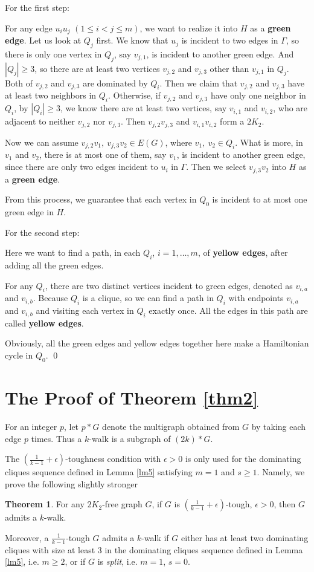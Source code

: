 \documentclass{amsart}
\theoremstyle{definition}
\newtheorem{theorem}{Theorem}
\begin{document}
For the first step:

For any edge $u_iu_j$ $(1\le i<j\le m)$, we want to realize it into $H$ as a {\bf green edge}. Let us look at $Q_j$ first. We know that $u_j$ is incident to two edges in $\Gamma$, so there is only one vertex in $Q_j$, say $v_{j,1}$, is incident to another green edge. And $|Q_j|\ge3$, so there are at least two vertices $v_{j,2}$ and $v_{j,3}$ other than $v_{j,1}$ in $Q_j$. Both of $v_{j,2}$ and $v_{j,3}$ are dominated by $Q_i$. Then we claim that $v_{j,2}$ and $v_{j,3}$ have at least two neighbors in $Q_i$. Otherwise, if $v_{j,2}$ and $v_{j,3}$ have only one neighbor in $Q_i$, by $|Q_i|\ge3$, we know there are at least two vertices, say $v_{i,1}$ and $v_{i,2}$, who are adjacent to neither $v_{j,2}$ nor $v_{j,3}$. Then $v_{j,2}v_{j,3}$ and $v_{i,1}v_{i,2}$ form a $2K_2$.

Now we can assume $v_{j,2}v_1,~v_{j,3}v_2\in E(G)$, where $v_1,~v_2\in Q_i$. What is more, in $v_1$ and $v_2$, there is at most one of them, say $v_1$, is incident to another green edge, since there are only two edges incident to $u_i$ in $\Gamma$. Then we select $v_{j,3}v_2$ into $H$ as a {\bf green edge}.

From this process, we guarantee that each vertex in $Q_0$ is incident to at most one green edge in $H$.

For the second step:

Here we want to find a path, in each $Q_i$, $i=1,\dots,m$, of {\bf yellow edges}, after adding all the green edges.

For any $Q_i$, there are two distinct vertices incident to green edges, denoted as $v_{i,a}$ and $v_{i,b}$. Because $Q_i$ is a clique, so we can find a path in $Q_i$ with endpoints $v_{i,a}$ and $v_{i,b}$ and visiting each vertex in $Q_i$ exactly once. All the edges in this path are called {\bf yellow edges}.

Obviously, all the green edges and yellow edges together here make a Hamiltonian cycle in $Q_0$.  \qed

\section{The Proof of Theorem \ref{thm2}}

For an integer $p$, let $p*G$ denote the multigraph obtained from $G$ by taking each edge $p$ times. 
Thus a $k$-walk is a subgraph of $(2k)*G$. 


The $(\frac{1}{k-1}+\epsilon)$-toughness condition with $\epsilon>0$ 
is only used for the dominating cliques sequence defined in Lemma \ref{lm5} 
satisfying $m=1$ and $s\geq 1$. Namely, we prove the following
slightly stronger
\begin{theorem}\label{opt}
For any $2K_2$-free graph $G$, if $G$ is $(\frac{1}{k-1}+\epsilon)$-tough, 
$\epsilon>0$, then $G$ admits a $k$-walk. 

Moreover, a $\frac{1}{k-1}$-tough $G$ admits a $k$-walk if $G$ either has at
least two dominating cliques with size at least 3 in the dominating cliques
sequence defined in Lemma \ref{lm5}, i.e. $m\ge2$, or if $G$ is {\em split},
i.e. $m=1$, $s=0$.  
\end{theorem}
\end{document}
